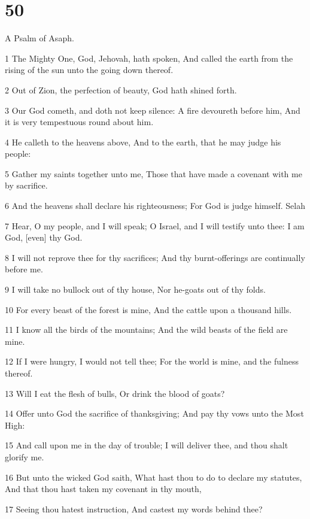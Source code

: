 \chapter{50}

\par A Psalm of Asaph.

\par 1 The Mighty One, God, Jehovah, hath spoken, And called the earth from the rising of the sun unto the going down thereof.
\par 2 Out of Zion, the perfection of beauty, God hath shined forth.
\par 3 Our God cometh, and doth not keep silence: A fire devoureth before him, And it is very tempestuous round about him.
\par 4 He calleth to the heavens above, And to the earth, that he may judge his people:
\par 5 Gather my saints together unto me, Those that have made a covenant with me by sacrifice.
\par 6 And the heavens shall declare his righteousness; For God is judge himself. Selah
\par 7 Hear, O my people, and I will speak; O Israel, and I will testify unto thee: I am God, [even] thy God.
\par 8 I will not reprove thee for thy sacrifices; And thy burnt-offerings are continually before me.
\par 9 I will take no bullock out of thy house, Nor he-goats out of thy folds.
\par 10 For every beast of the forest is mine, And the cattle upon a thousand hills.
\par 11 I know all the birds of the mountains; And the wild beasts of the field are mine.
\par 12 If I were hungry, I would not tell thee; For the world is mine, and the fulness thereof.
\par 13 Will I eat the flesh of bulls, Or drink the blood of goats?
\par 14 Offer unto God the sacrifice of thanksgiving; And pay thy vows unto the Most High:
\par 15 And call upon me in the day of trouble; I will deliver thee, and thou shalt glorify me.
\par 16 But unto the wicked God saith, What hast thou to do to declare my statutes, And that thou hast taken my covenant in thy mouth,
\par 17 Seeing thou hatest instruction, And castest my words behind thee?
